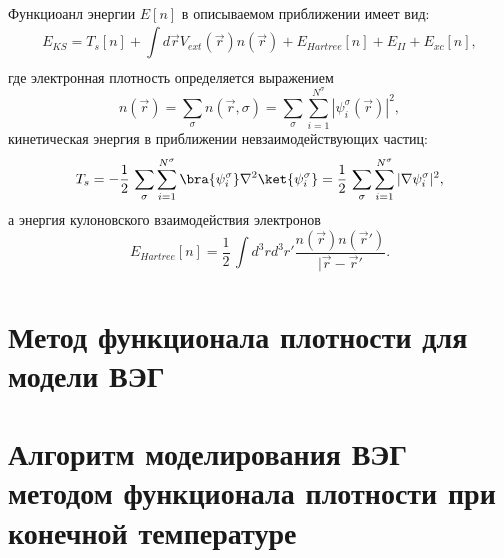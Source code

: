 Функциоанл энергии $E[n]$ в описываемом приближении имеет вид:
\begin{equation}
    \label{eq:dft:E_KS-def}
    E_{KS} = T_{s} [n] + \int\limits_{}^{} d \vec{r} V_{ext} (\vec{r}) n(\vec{r}) + E_{Hartree} [n] + E_{II}  + E_{xc} [n],  
\end{equation}
где электронная плотность определяется выражением
\begin{equation}
    \label{eq:dft:density-kohn}
    n (\vec{r}) = \sum\limits_{\sigma}^{} n(\vec{r}, \sigma) = \sum\limits_{\sigma}^{} \sum\limits_{i=1}^{N^{\sigma} } |\psi_i^{\sigma} (\vec{r})|^2, 
\end{equation}
кинетическая энергия в приближении невзаимодействующих частиц:
\begin{equation}
    \label{eq:dft:T_s-def}
    T_{s}  = - \frac{1}{2}\, \sum\limits_{\sigma}^{}\sum\limits_{i=1}^{N^{\sigma}} \bra{\psi_i^{\sigma} } \nabla^2 \ket{\psi_i^{\sigma}} 
     = \frac{1}{2}\, \sum\limits_{\sigma}^{} \sum\limits_{i=1}^{N^{\sigma} } |\nabla \psi_i^{\sigma} |^2,
\end{equation}
а энергия кулоновского взаимодействия электронов
\begin{equation}
    \label{eq:dft:E_Hartree-def}
    E_{Hartree} [n] = \frac{1}{2}\, \int\limits_{}^{}d^3 r d^3 r' \frac{n(\vec{r}) n(\vec{r}')}{|\vec{r} - \vec{r}'}.
\end{equation}

\section{Метод функционала плотности для модели ВЭГ}

\section{Алгоритм моделирования ВЭГ методом функционала плотности при конечной температуре}
